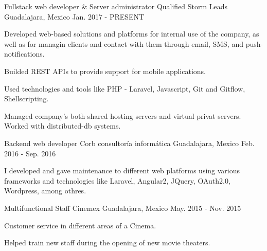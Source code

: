\begin{cventries}
  \cventry
    {Fullstack web developer \& Server administrator}
    {Qualified Storm Leads}
    {Guadalajara, Mexico}
    {Jan. 2017 - PRESENT}
    {
      \begin{cvitems}
        \item {Developed web-based solutions and platforms for internal use of the company, as well as for managin clients and contact with them through email, SMS, and push-notifications.}
        \item {Builded REST APIs to provide support for mobile applications.}
        \item {Used technologies and tools like PHP - Laravel, Javascript, Git and Gitflow, Shellscripting.}
        \item {Managed company's both shared hosting servers and virtual privat servers. Worked with distributed-db systems.}
      \end{cvitems}
    }
  \cventry
    {Backend web developer}
    {Corb consultoría informática}
    {Guadalajara, Mexico}
    {Feb. 2016 - Sep. 2016}
    {
      \begin{cvitems}
        \item {I developed and gave maintenance to different web platforms using various frameworks and technologies like Laravel, Angular2, JQuery, OAuth2.0, Wordpress, among othres.}
      \end{cvitems}
    }
  \cventry
    {Multifunctional Staff}
    {Cinemex}
    {Guadalajara, Mexico}
    {May. 2015 - Nov. 2015}
    {
      \begin{cvitems}
        \item {Customer service in different areas of a Cinema.}
        \item {Helped train new staff during the opening of new movie theaters.}
      \end{cvitems}
    }
\end{cventries}
